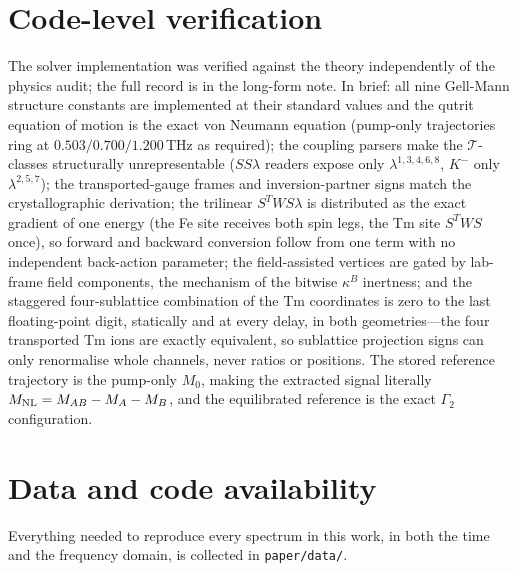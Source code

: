 \documentclass[11pt]{article}
\newcommand{\Mnl}{M_{\rm NL}}
\begin{document}
\section{Code-level verification}
\label{si:codeaudit}

The solver implementation was verified against the theory
independently of the physics audit; the full record is in the
long-form note.  In brief: all nine Gell-Mann structure constants are
implemented at their standard values and the qutrit equation of
motion is the exact von Neumann equation (pump-only trajectories ring
at $0.503/0.700/1.200$\,THz as required); the coupling parsers make
the $\mathcal T$-classes structurally unrepresentable ($SS\lambda$
readers expose only $\lambda^{1,3,4,6,8}$, $K^-$ only
$\lambda^{2,5,7}$); the transported-gauge frames and
inversion-partner signs match the crystallographic derivation; the
trilinear $S^TWS\lambda$ is distributed as the exact gradient of one
energy (the Fe site receives both spin legs, the Tm site
$S^TWS$ once), so forward and backward conversion follow from one
term with no independent back-action parameter; the field-assisted
vertices are gated by lab-frame field components, the mechanism of
the bitwise $\kappa^B$ inertness; and the staggered four-sublattice
combination of the Tm coordinates is zero to the last floating-point
digit, statically and at every delay, in both geometries---the four
transported Tm ions are exactly equivalent, so sublattice projection
signs can only renormalise whole channels, never ratios or positions.
The stored reference trajectory is the pump-only $M_0$, making the
extracted signal literally $\Mnl=M_{AB}-M_A-M_B$, and the
equilibrated reference is the exact $\Gamma_2$ configuration.

\section{Data and code availability}
Everything needed to reproduce every spectrum in this work, in both the
time and the frequency domain, is collected in \texttt{paper/data/}.
\end{document}
